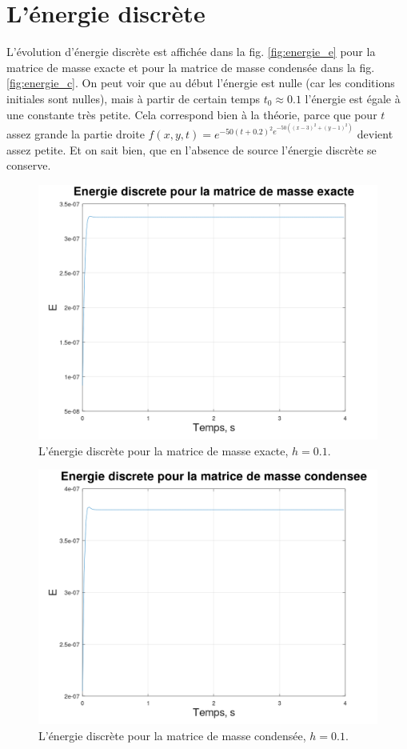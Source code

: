 \documentclass[12pt]{article}
\begin{document}
\section{L'énergie discrète}
L'évolution d'énergie discrète est affichée dans la fig. \eqref{fig:energie_e} pour la matrice de masse exacte et  pour la matrice de masse condensée dans la fig. \eqref{fig:energie_c}. On peut voir que  au début l'énergie est nulle (car les conditions initiales sont nulles), mais à partir de certain temps $t_0 \approx 0.1$ l'énergie est égale à une constante très petite. Cela correspond bien à la théorie, parce que pour $t$ assez grande la partie droite $f(x, y, t) = e^{-50(t + 0.2)^2 e^{-50((x - 3)^2 + (y - 1)^2)}} $ devient assez petite. Et on sait bien, que en l'absence de source l'énergie discrète se conserve.
\begin{figure}[H]
	\centering
	\includegraphics[height=0.4\linewidth]{images/E_01}
	\caption{L'énergie discrète pour la matrice de masse exacte, $h=0.1$.}
	\label{fig:energie_e}
\end{figure}
\begin{figure}[H]
	\centering
	\includegraphics[height=0.4\linewidth]{images/E_cond_01}
	\caption{L'énergie discrète pour la matrice de masse condensée, $h=0.1$.}
	\label{fig:energie_c}
\end{figure}	
\end{document}
